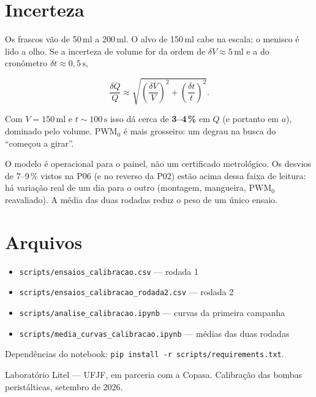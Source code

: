 \documentclass[11pt,a4paper]{article}
\newcommand{\pwmz}{\mathrm{PWM}_0}
\begin{document}
\section{Incerteza}

Os frascos vão de 50\,ml a 200\,ml. O alvo de 150\,ml cabe na escala; o
menisco é lido a olho. Se a incerteza de volume for da ordem de
$\delta V \approx 5\,\mathrm{ml}$ e a do cronômetro
$\delta t \approx 0{,}5\,\mathrm{s}$,

\begin{equation}
\frac{\delta Q}{Q}
  \approx \sqrt{\left(\frac{\delta V}{V}\right)^2 + \left(\frac{\delta t}{t}\right)^2}.
\end{equation}

Com $V=150\,\mathrm{ml}$ e $t\sim 100\,\mathrm{s}$ isso dá cerca de
\textbf{3--4\,\%} em $Q$ (e portanto em $a$), dominado pelo volume.
$\pwmz$ é mais grosseiro: um degrau na busca do ``começou a girar''.

O modelo é operacional para o painel, não um certificado metrológico. Os
desvios de 7--9\,\% vistos na P06 (e no reverso da P02) estão acima dessa
faixa de leitura: há variação real de um dia para o outro (montagem,
mangueira, $\pwmz$ reavaliado). A média das duas rodadas reduz o peso de um
único ensaio.

\section{Arquivos}

\begin{itemize}
  \item \texttt{scripts/ensaios\_calibracao.csv} --- rodada 1
  \item \texttt{scripts/ensaios\_calibracao\_rodada2.csv} --- rodada 2
  \item \texttt{scripts/analise\_calibracao.ipynb} --- curvas da primeira campanha
  \item \texttt{scripts/media\_curvas\_calibracao.ipynb} --- médias das duas rodadas
\end{itemize}

Dependências do notebook: \texttt{pip install -r scripts/requirements.txt}.

\vspace{1.2em}
{\small\color{muted}Laboratório Litel --- UFJF, em parceria com a Copasa.
Calibração das bombas peristálticas, setembro de 2026.}
\end{document}
